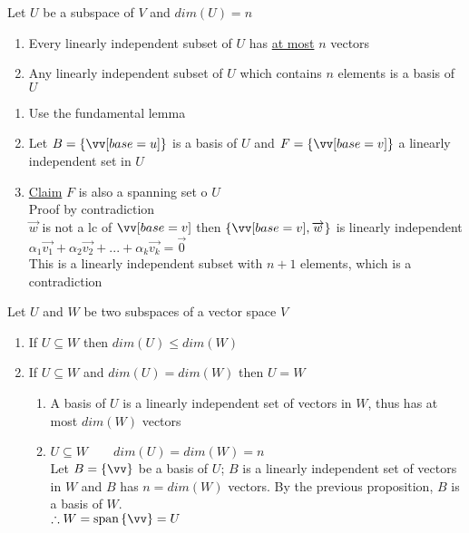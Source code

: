 \documentclass[12pt]{article}
\renewcommand{\v}[1]{\overrightarrow{#1}}
\newcommand{\vectorseqtwo}[2]{#1_1\v{#2_1} + #1_2\v{#2_2} + ... + #1_k\v{#2_k}}
\newenvironment{proof}{\block[Proof]}{\endblock}
\newenvironment{proposition}{\block[Proposition]}{\endblock}
\newcommand{\bb}[1]{\left\{#1\right\}}
\newcommand{\sspan}[1]{\text{span}\bb{#1}}
\begin{document}
	\begin{proposition}
		Let $U$ be a subspace of $V$ and $dim(U) = n$
		
		\begin{enumerate}
			\item Every linearly independent subset of $U$ has \underline{at most} $n$ vectors
			\item Any linearly independent subset of $U$ which contains $n$ elements is a basis of $U$
		\end{enumerate}
		
		\begin{proof}
			\begin{enumerate}
				\item Use the fundamental lemma
				\item Let $B = \bb{\vv[base=u]}$ is a basis of $U$ and $F = \bb{\vv[base=v]}$ a linearly independent set in $U$
				\item \underline{Claim} $F$ is also a spanning set o $U$ \\
				Proof by contradiction \\
				$\v{w}$ is not a lc of $\vv[base=v]$ then $\bb{\vv[base=v], \v{w}}$ is linearly independent \\
				$\vectorseqtwo{\alpha}{v} = \v{0}$ \\
				This is a linearly independent subset with $n + 1$ elements, which is a contradiction
			\end{enumerate}
		\end{proof}
	\end{proposition}
	
	\begin{proposition}
		Let $U$ and $W$ be two subspaces of a vector space $V$
		\begin{enumerate}
			\item If $U \subseteq W$ then $dim(U) \le dim(W)$ 
			\item If $U \subseteq W$ and $dim(U) = dim(W)$ then $U = W$
			\begin{proof}
				\begin{enumerate}
					\item A basis of $U$ is a linearly independent set of vectors in $W$, thus has at most $dim(W)$ vectors
					\item $U \subseteq W \qquad dim(U) = dim(W) = n$ \\
					Let $B = \bb{\vv}$ be a basis of $U$; $B$ is a linearly independent set of vectors in $W$ and $B$ has $n = dim(W)$ vectors. By the previous proposition, $B$ is a basis of $W$. \\
					$\therefore W = \sspan{\vv} = U$
				\end{enumerate}
			\end{proof}
		\end{enumerate}
	\end{proposition}
	
\end{document}
